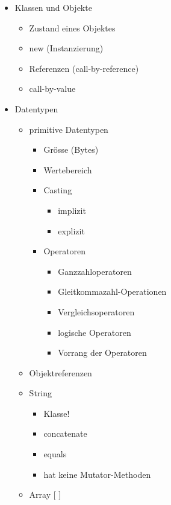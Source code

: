 \begin{itemize}
    \item Klassen und Objekte
    \begin{itemize}
        \item Zustand eines Objektes
        \item new (Instanzierung)
        \item Referenzen (call-by-reference)
        \item call-by-value
    \end{itemize}
    
    \item Datentypen
    \begin{itemize}
        \item primitive Datentypen
        \begin{itemize}
            \item Grösse (Bytes)
            \item Wertebereich
            \item Casting
            \begin{itemize}
                \item implizit
                \item explizit
            \end{itemize}
            \item Operatoren
            \begin{itemize}
                \item Ganzzahloperatoren
                \item Gleitkommazahl-Operationen
                \item Vergleichsoperatoren
                \item logische Operatoren
                \item Vorrang der Operatoren
            \end{itemize}
        \end{itemize}
        \item Objektreferenzen
        \item String
        \begin{itemize}
            \item Klasse!
            \item concatenate
            \item equals
            \item hat keine Mutator-Methoden
        \end{itemize} 
        \item Array [ ]  
    \end{itemize}
    

\end{itemize}
